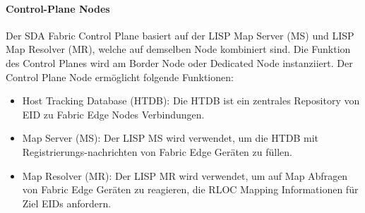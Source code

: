 \paragraph{Control-Plane Nodes}
Der SDA Fabric Control Plane basiert auf der LISP Map Server (MS) und LISP Map Resolver (MR), welche auf demselben Node kombiniert sind. Die Funktion des Control Planes wird am Border Node oder Dedicated Node instanziiert. Der Control Plane Node ermöglicht folgende Funktionen: \cite{sda-designguide}
\begin{itemize}	
	\item Host Tracking Database (HTDB): Die HTDB ist ein zentrales Repository von EID zu Fabric Edge Nodes Verbindungen.
	\item Map Server (MS): Der LISP MS wird verwendet, um die HTDB mit Registrierungs-nachrichten von Fabric Edge Geräten zu füllen.
	\item Map Resolver (MR): Der LISP MR wird verwendet, um auf Map Abfragen von Fabric Edge Geräten zu reagieren, die RLOC Mapping Informationen für Ziel EIDs anfordern.
\end{itemize}

